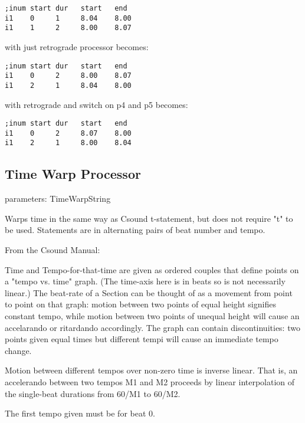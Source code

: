 \begin{verbatim}
;inum start dur   start   end
i1    0     1     8.04    8.00
i1    1     2     8.00    8.07
\end{verbatim}

with just retrograde processor becomes:

\begin{verbatim}
;inum start dur   start   end
i1    0     2     8.00    8.07
i1    2     1     8.04    8.00
\end{verbatim}

with retrograde and switch on p4 and p5 becomes:

\begin{verbatim}
;inum start dur   start   end
i1    0     2     8.07    8.00
i1    2     1     8.00    8.04
\end{verbatim}


\subsection{Time Warp Processor}\label{timewarpProcessor}

parameters: TimeWarpString

Warps time in the same way as Csound t-statement, but does not require
"t" to be used. Statements are in alternating pairs of beat number and
tempo.

From the Csound Manual:

Time and Tempo-for-that-time are given as ordered couples that define
points on a "tempo vs. time" graph. (The time-axis here is in beats so
is not necessarily linear.) The beat-rate of a Section can be thought of
as a movement from point to point on that graph: motion between two
points of equal height signifies constant tempo, while motion between
two points of unequal height will cause an accelarando or ritardando
accordingly. The graph can contain discontinuities: two points given
equal times but different tempi will cause an immediate tempo change.

Motion between different tempos over non-zero time is inverse linear.
That is, an accelerando between two tempos M1 and M2 proceeds by linear
interpolation of the single-beat durations from 60/M1 to 60/M2.

The first tempo given must be for beat 0.

